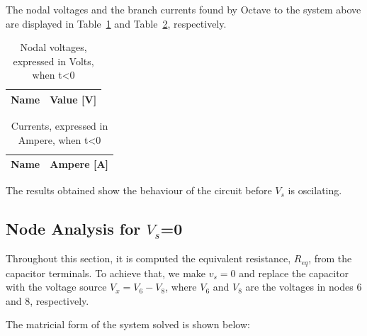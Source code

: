 The nodal voltages and the branch currents found by Octave to the system above
are displayed in Table~\ref{tab:volt1} and Table~\ref{tab:curr1}, respectively.\par

\begin{minipage}
\centering
\begin{table} [b]
  \begin{tabular}{|l|r|}
    \hline    
    {\bf Name} & {\bf Value [V]} \\ \hline
    
  \end{tabular}
  \caption{Nodal voltages, expressed in Volts, when t<0}
  \label{tab:volt1}
\end{table}
\end{minipage}
\begin{minipage}
\begin{table} [b]
  \begin{tabular}{|l|r|}
    \hline    
    {\bf Name} & {\bf Ampere [A]} \\ \hline
    
  \end{tabular}
  \caption{Currents, expressed in Ampere, when t<0}
  \label{tab:curr1}
\end{table}
\end{minipage}

The results obtained show the behaviour of the circuit before $V_s$ is oscilating.

\subsection{Node Analysis for $V_s$=0}
\label{vs=0}

Throughout this section, it is computed the equivalent resistance, $R_{eq}$, from
the capacitor terminals. To achieve that, we make $v_{s}=0$ and replace the capacitor
with the voltage source $V_{x}=V_{6}-V_{8}$, where $V_6$ and $V_8$ are the voltages
in nodes 6 and 8, respectively.\par
The matricial form of the system solved is shown below:\par

